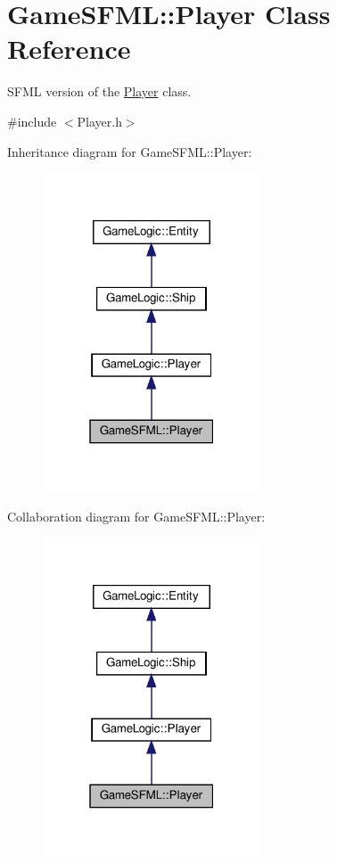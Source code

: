 \hypertarget{classGameSFML_1_1Player}{}\section{Game\+S\+F\+ML\+:\+:Player Class Reference}
\label{classGameSFML_1_1Player}


S\+F\+ML version of the \hyperlink{classGameSFML_1_1Player}{Player} class.  




{\ttfamily \#include $<$Player.\+h$>$}



Inheritance diagram for Game\+S\+F\+ML\+:\+:Player\+:
\nopagebreak
\begin{figure}[H]
\begin{center}
\leavevmode
\includegraphics[width=183pt]{classGameSFML_1_1Player__inherit__graph}
\end{center}
\end{figure}


Collaboration diagram for Game\+S\+F\+ML\+:\+:Player\+:
\nopagebreak
\begin{figure}[H]
\begin{center}
\leavevmode
\includegraphics[width=183pt]{classGameSFML_1_1Player__coll__graph}
\end{center}
\end{figure}
